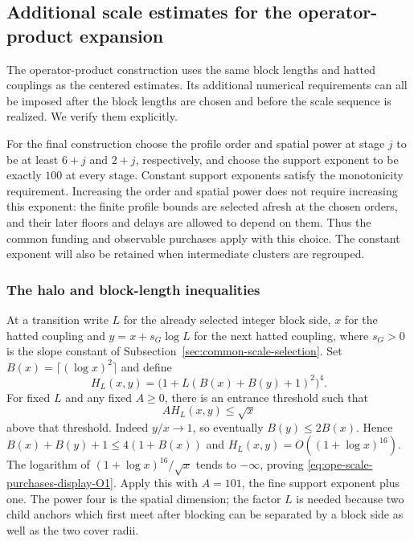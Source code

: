 \subsection{Additional scale estimates for the operator-product expansion}
\label{sec:ope-scale-purchases}
The operator-product construction uses the same block lengths and
hatted couplings as the centered estimates. Its additional numerical
requirements can all be imposed after the block lengths are chosen
and before the scale sequence is realized. We verify them explicitly.

For the final construction choose the profile order and spatial power
at stage $j$ to be at least $6+j$ and $2+j$, respectively, and choose
the support exponent to be exactly $100$ at every stage. Constant
support exponents satisfy the monotonicity requirement. Increasing the
order and spatial power does not require increasing this exponent:
the finite profile bounds are selected afresh at the chosen orders,
and their later floors and delays are allowed to depend on them.
Thus the common funding and observable purchases apply with this
choice. The constant exponent will also be retained when intermediate
clusters are regrouped.

\subsubsection{The halo and block-length inequalities}
At a transition write $L$ for the already selected integer block side,
$x$ for the hatted coupling and $y=x+s_G\log L$ for the next hatted
coupling, where $s_G>0$ is the slope constant of
Subsection~\ref{sec:common-scale-selection}. Set $B(x)=\lceil(\log x)^2\rceil$ and define
\[
 H_L(x,y)=\bigl(1+L(B(x)+B(y)+1)^2\bigr)^4.
\]
For fixed $L$ and any fixed $A\ge0$, there is an entrance threshold
such that
\begin{equation}
                         A H_L(x,y)\le\sqrt x
 \label{eq:ope-scale-purchases-display-O1}
\end{equation}
above that threshold. Indeed $y/x\to1$, so eventually
$B(y)\le2B(x)$. Hence $B(x)+B(y)+1\le4(1+B(x))$ and
$H_L(x,y)=O((1+\log x)^{16})$. The logarithm of
$(1+\log x)^{16}/\sqrt x$ tends to $-\infty$, proving \eqref{eq:ope-scale-purchases-display-O1}.
Apply this with $A=101$, the fine support exponent plus one.
The power four is the spatial dimension; the factor $L$ is needed
because two child anchors which first meet after blocking can be
separated by a block side as well as the two cover radii.

